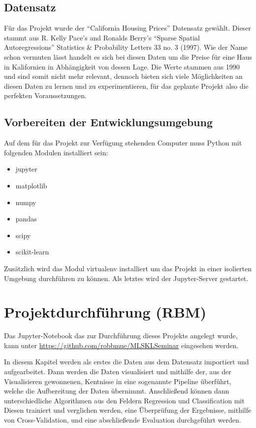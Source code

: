 \section{Datensatz}
\label{sec:datensatz}
Für das Projekt wurde der “California Housing Prices” Datensatz gewählt. Dieser stammt aus R. Kelly Pace’s and Ronalds Berry’s “Sparse Spatial Autoregressions” Statistics \& Probability Letters 33 no. 3 (1997). Wie der Name schon vermuten lässt handelt es sich bei diesen Daten um die Preise für eine Haus in Kalifornien in Abhängigkeit von dessen Lage. Die Werte stammen aus 1990  und sind somit nicht mehr relevant, dennoch bieten sich viele Möglichkeiten an diesen Daten zu lernen und zu experimentieren, für das geplante Projekt also die perfekten Voraussetzungen.

\section{Vorbereiten der Entwicklungsumgebung}
\label{sec:vorbereitenEntwicklungsumgebung}
Auf dem für das Projekt zur Verfügung stehenden Computer muss Python mit folgenden Modulen installiert sein: 
\begin{itemize}
\item jupyter
\item matplotlib
\item numpy
\item pandas
\item scipy
\item scikit-learn
\end{itemize}
Zusätzlich wird das Modul virtualenv installiert um das Projekt in einer isolierten Umgebung durchführen zu können. Als letztes wird der Jupyter-Server gestartet.

\chapter{Projektdurchführung (RBM)}
\label{chap:projektdurchführung}
Das Jupyter-Notebook das zur Durchführung dieses Projekts angelegt wurde, kann unter \href{https://github.com/robbmue/MLSKLSeminar}{https://github.com/robbmue/MLSKLSeminar} eingesehen werden.

In diesem Kapitel werden als erstes die Daten aus dem Datensatz importiert und aufgearbeitet. Dann werden die Daten visualisiert und mithilfe der, aus der Visualisieren gewonnenen, Kentnisse in eine sogenannte Pipeline überführt, welche die Aufbereitung der Daten übernimmt.
Anschließend können dann unterschiedliche Algorithmen aus den Feldern Regression und Classification mit Diesen trainiert und verglichen werden, eine Überprüfung der Ergebnisse, mithilfe von Cross-Validation, und eine abschließende Evaluation durchgeführt werden.

